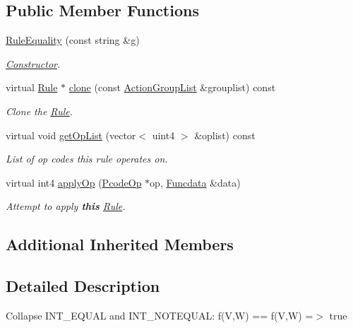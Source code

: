 \subsection*{Public Member Functions}
\begin{DoxyCompactItemize}
\item 
\mbox{\hyperlink{class_rule_equality_a554613610cb9bcb4d8f8e66aad56fb69}{Rule\+Equality}} (const string \&g)
\begin{DoxyCompactList}\small\item\em \mbox{\hyperlink{class_constructor}{Constructor}}. \end{DoxyCompactList}\item 
virtual \mbox{\hyperlink{class_rule}{Rule}} $\ast$ \mbox{\hyperlink{class_rule_equality_a78a0d12ca064653dd2ed59dee9d01cd3}{clone}} (const \mbox{\hyperlink{class_action_group_list}{Action\+Group\+List}} \&grouplist) const
\begin{DoxyCompactList}\small\item\em Clone the \mbox{\hyperlink{class_rule}{Rule}}. \end{DoxyCompactList}\item 
virtual void \mbox{\hyperlink{class_rule_equality_a06e285491252338eab8722052a845e8c}{get\+Op\+List}} (vector$<$ uint4 $>$ \&oplist) const
\begin{DoxyCompactList}\small\item\em List of op codes this rule operates on. \end{DoxyCompactList}\item 
virtual int4 \mbox{\hyperlink{class_rule_equality_a1eec6d7734884df00533e207ead6de4b}{apply\+Op}} (\mbox{\hyperlink{class_pcode_op}{Pcode\+Op}} $\ast$op, \mbox{\hyperlink{class_funcdata}{Funcdata}} \&data)
\begin{DoxyCompactList}\small\item\em Attempt to apply {\bfseries{this}} \mbox{\hyperlink{class_rule}{Rule}}. \end{DoxyCompactList}\end{DoxyCompactItemize}
\subsection*{Additional Inherited Members}


\subsection{Detailed Description}
Collapse I\+N\+T\+\_\+\+E\+Q\+U\+AL and I\+N\+T\+\_\+\+N\+O\+T\+E\+Q\+U\+AL\+: {\ttfamily f(\+V,\+W) == f(\+V,\+W) =$>$ true} 

